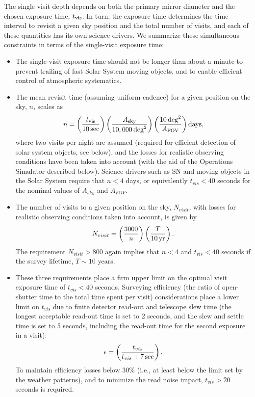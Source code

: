 \documentclass{emulateapj}
\begin{document}
The single visit depth depends on both the primary mirror diameter and the
chosen exposure time, $t_{\rm vis}$. In turn, the exposure time 
determines the time interval to revisit a given sky position and the total 
number of visits, and each of these quantities has its own science 
drivers. We summarize these simultaneous constraints in terms of the 
single-visit exposure time:
\begin{itemize}
\item  The single-visit exposure time should not be longer than about a minute to 
         prevent trailing of fast Solar System moving objects, and to enable efficient
         control of atmospheric systematics.
\item  The mean revisit time (assuming uniform cadence) for a given position 
         on the sky, $n$, scales as 
\begin{equation}
  n = \left( {t_{\rm vis} \over 10  \, {\rm sec}} \right)
      \left( { A_{\rm sky} \over 10,000  \, {\rm deg}^2} \right)
      \left( {10 \, {\rm deg}^2 \over  A_{\rm FOV}} \right) {\rm days},
\end{equation}
where two visits per night are assumed (required for efficient detection of 
solar system objects, see below), and the losses for realistic observing conditions 
have been taken into account (with the aid of the Operations Simulator described below). 
Science drivers such as SN and moving objects in the Solar System require 
that $n<4$ days, or equivalently $t_{vis} < 40$ seconds for the nominal values 
of $A_{sky} $ and $A_{FOV}$. 
\item  The number of visits to a given position on the sky, $N_{visit}$,
with losses for realistic observing conditions taken into account,
is given by
\begin{equation}
      N_{visit} = \left( {3000 \over n} \right)
                    \left( { T \over 10 \, {\rm yr}} \right).
\end{equation}
The requirement $N_{visit}>800$ again implies that $n<4$ and 
$t_{vis} < 40$ seconds if the survey lifetime, $T \sim 10$ years. 
\item  These three requirements place a firm upper limit on the 
optimal visit exposure time of $t_{vis} < 40$ seconds. Surveying 
efficiency (the ratio of open-shutter time to the total
time spent per visit) considerations place a lower limit on 
$t_{vis}$ due to finite detector read-out and telescope slew time (the longest 
acceptable read-out time is set to 2 seconds, and the slew and 
settle time is set to 5 seconds, including the read-out time
for the second exposure in a visit):
\begin{equation}
      \epsilon = \left( {t_{vis} \over t_{vis} + 7 \, {\rm sec}}\right).
\end{equation}
To maintain efficiency losses below 30\% (i.e., at least below the 
limit set by the weather patterns), and to minimize the read noise
impact, $t_{vis} > 20$ seconds is required. 
\end{itemize}
\end{document}
